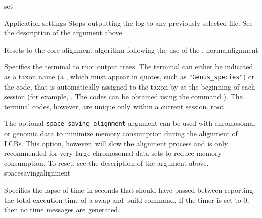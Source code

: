 \begin{command}{set}{}
\begin{arguments}
\begin{argumentgroup}{Application settings}
                {Stops outputting the log to any previously selected
                file. See the description of the argument 
                above.}
                {}
            
                {Resets to the core alignment algorithm following the use of 
                the .}
                {normalalignment}
                
                {Specifies the terminal to root output trees.
                 The terminal can either be indicated as a taxon name (a
                \poystring, which must appear in quotes, such as
                \texttt{"Genus\_species"}) or the code, that is automatically
                assigned to the taxon by \poy at the beginning of each \poy
                session (for example, . The codes can
                be obtained using the command ).  The
                terminal codes, however, are unique only within a current
                session.}
                {root}
              
                        {The optional \texttt {space\_saving\_alignment} argument can be used with 
                        chromosomal or genomic data to minimize memory 
                        consumption during the alignment of LCBs.  This option, 
                        however, will slow the alignment process and is only 
                        recommended for very large chromosomal data sets to 
                        reduce memory consumption. To reset, see the description of the 
                        argument  above.}
                        {spacesavingalignment}
                        
                {Specifies the lapse of time in seconds that should have passed
                between reporting the total execution time of a swap and build
                command. If the timer is set to 0, then no time messages are
                generated.}{}
                
  


\end{argumentgroup}
\end{arguments}
\end{command}
